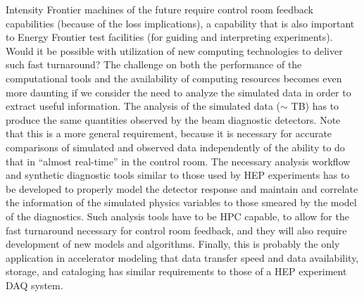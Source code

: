 Intensity Frontier machines of the future require control room
feedback capabilities (because of the loss implications), a
capability that is also important to Energy Frontier test
facilities (for guiding and interpreting experiments).   Would it
be possible with utilization of new computing technologies to
deliver such fast turnaround?  The challenge on both the
performance of the computational tools and the availability of
computing resources becomes even  more daunting if we consider
the need to analyze the simulated data in order to extract useful
information.  The analysis of the simulated data ($\sim$ TB) has
to produce the same quantities observed by the beam diagnostic
detectors.  Note that this is a more general requirement, because
it is necessary for accurate comparisons of simulated and
observed data independently of the ability to do that in ``almost
real-time'' in the control room.  The necessary analysis workflow
and synthetic diagnostic tools similar to those used by HEP
experiments has to be developed to properly model the detector
response and maintain and correlate the information of the
simulated physics variables to those smeared by the model of the
diagnostics.  Such analysis tools have to be HPC capable, to
allow for the fast turnaround necessary for control room
feedback, and they will also require development of new models
and algorithms.  Finally, this is probably the only application
in accelerator modeling that data transfer speed and data
availability, storage, and cataloging has similar requirements to
those of a HEP experiment DAQ system.



